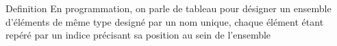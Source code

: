 \begin{frame}
    \begin{block}{Definition}
        En programmation,
        on parle de tableau pour d\'esigner un ensemble d'\'el\'ements de m\^eme type design\'e par un nom unique,
        chaque \'el\'ement \'etant rep\'er\'e par un indice pr\'ecisant sa position au sein de l'ensemble
    \end{block}
\end{frame}